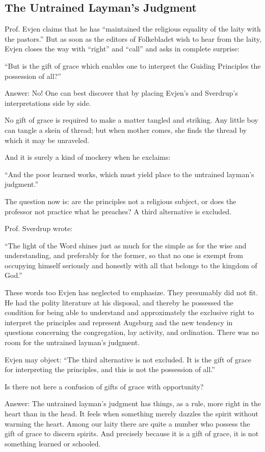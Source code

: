 \subsection{The Untrained Layman’s Judgment}

Prof. Evjen claims that he has “maintained the religious equality of the laity with the pastors.” But as soon as the editors of Folkebladet wish to hear from the laity, Evjen closes the way with “right” and “call” and asks in complete surprise:

“But is the gift of grace which enables one to interpret the Guiding Principles the possession of all?”

Answer: No! One can best discover that by placing Evjen’s and Sverdrup’s interpretations side by side.

No gift of grace is required to make a matter tangled and striking. Any little boy can tangle a skein of thread; but when mother comes, she finds the thread by which it may be unraveled.

And it is surely a kind of mockery when he exclaims:

“And the poor learned works, which must yield place to the untrained layman’s judgment.”

The question now is: are the principles not a religious subject, or does the professor not practice what he preaches? A third alternative is excluded.

Prof. Sverdrup wrote:

“The light of the Word shines just as much for the simple as for the wise and understanding, and preferably for the former, so that no one is exempt from occupying himself seriously and honestly with all that belongs to the kingdom of God.”

These words too Evjen has neglected to emphasize. They presumably did not fit. He had the polity literature at his disposal, and thereby he possessed the condition for being able to understand and approximately the exclusive right to interpret the principles and represent Augsburg and the new tendency in questions concerning the congregation, lay activity, and ordination. There was no room for the untrained layman’s judgment.

Evjen may object: “The third alternative is not excluded. It is the gift of grace for interpreting the principles, and this is not the possession of all.”

Is there not here a confusion of gifts of grace with opportunity?

Answer: The untrained layman’s judgment has things, as a rule, more right in the heart than in the head. It feels when something merely dazzles the spirit without warming the heart. Among our laity there are quite a number who possess the gift of grace to discern spirits. And precisely because it is a gift of grace, it is not something learned or schooled.

